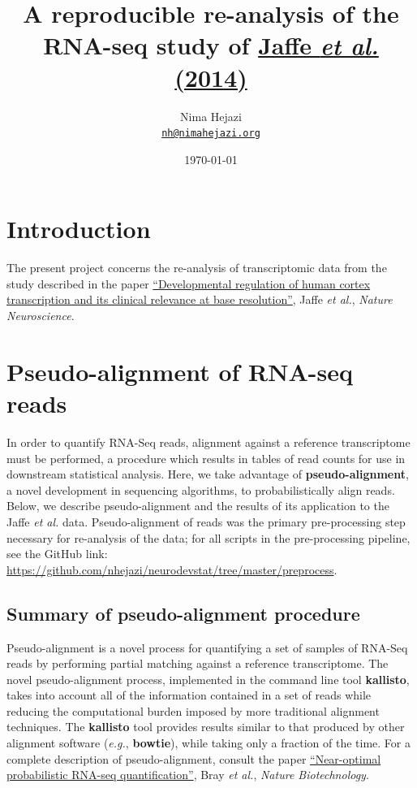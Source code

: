 \documentclass[11pt]{article}
\title{A reproducible re-analysis of the RNA-seq study of
  \href{http://www.nature.com/neuro/journal/v18/n1/abs/nn.3898.html}{Jaffe
  \textit{et al.} (2014)}
}
\author{ Nima Hejazi \\
  \href{mailto:nh@nimahejazi.org}{\texttt{nh@nimahejazi.org}}
}
\date{\monthyeardate\today}
\begin{document}
\maketitle


\section{Introduction}
The present project concerns the re-analysis of transcriptomic data from the
study described in the paper
{\href{http://www.nature.com/neuro/journal/v18/n1/abs/nn.3898.html}
{``Developmental regulation of human cortex transcription and its clinical
relevance at base resolution''}}, Jaffe \textit{et al.}, \textit{Nature
Neuroscience}.


\section{Pseudo-alignment of RNA-seq reads}
In order to quantify RNA-Seq reads, alignment against a reference transcriptome
must be performed, a procedure which results in tables of read counts for use in
downstream statistical analysis. Here, we take advantage of
\textbf{pseudo-alignment}, a novel development in sequencing algorithms, to
probabilistically align reads. Below, we describe pseudo-alignment and the
results of its application to the Jaffe \textit{et al.} data. Pseudo-alignment
of reads was the primary pre-processing step necessary for re-analysis of the
data; for all scripts in the pre-processing pipeline, see the GitHub link:
\url{https://github.com/nhejazi/neurodevstat/tree/master/preprocess}.


\subsection{Summary of pseudo-alignment procedure}
Pseudo-alignment is a novel process for quantifying a set of samples of RNA-Seq
reads by performing partial matching against a reference transcriptome. The
novel pseudo-alignment process, implemented in the command line tool
\textbf{kallisto}, takes into account all of the information contained in a set
of reads while reducing the computational burden imposed by more traditional
alignment techniques. The \textbf{kallisto} tool provides results similar to
that produced by other alignment software (\textit{e.g.}, \textbf{bowtie}),
while taking only a fraction of the time. For a complete description of
pseudo-alignment, consult the paper
{\href{http://www.nature.com/nbt/journal/v34/n5/full/nbt.3519.html}
{``Near-optimal probabilistic RNA-seq quantification''}}, Bray \textit{et al.},
\textit{Nature Biotechnology}.
\end{document}
